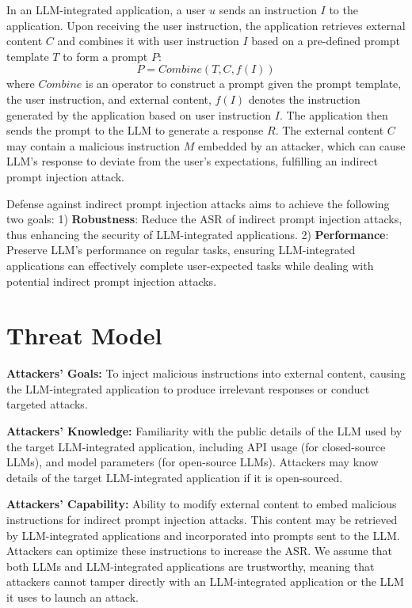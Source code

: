 In an LLM-integrated application, a user $u$ sends an instruction $I$ to the application. Upon receiving the user instruction, the application retrieves external content $C$ and combines it with user instruction $I$ based on a pre-defined prompt template $T$ to form a prompt $P$:
\begin{equation}
    P = Combine(T, C, f(I))
\end{equation}
where $\textit{Combine}$ is an operator to construct a prompt given the prompt template, the user instruction, and external content, $f(I)$ denotes the instruction generated by the application based on user instruction $I$. 
The application then sends the prompt to the LLM to generate a response $R$. The external content $C$ may contain a malicious instruction $M$ embedded by an attacker, which can cause LLM's response to deviate from the user's expectations, fulfilling an indirect prompt injection attack.

Defense against indirect prompt injection attacks aims to achieve the following two goals:
1) \textbf{Robustness}: Reduce the ASR of indirect prompt injection attacks, thus enhancing the security of LLM-integrated applications.
2) \textbf{Performance}: Preserve LLM's performance on regular tasks, ensuring  LLM-integrated applications can effectively complete user-expected tasks while dealing with potential indirect prompt injection attacks.

\section{Threat Model}

\noindent \textbf{Attackers' Goals:} To inject malicious instructions into external content, causing the LLM-integrated application to produce irrelevant responses or conduct targeted attacks. %

\noindent \textbf{Attackers' Knowledge:}
Familiarity with the public details of the LLM used by the target LLM-integrated application, including API usage (for closed-source LLMs), and model parameters (for open-source LLMs). Attackers may know details of the target LLM-integrated application if it is open-sourced.

\noindent \textbf{Attackers' Capability:}
Ability to modify external content to embed malicious instructions for indirect prompt injection attacks. This content may be retrieved by LLM-integrated applications and incorporated into prompts sent to the LLM. Attackers can optimize these instructions to increase the ASR. We assume that both LLMs and LLM-integrated applications are trustworthy, meaning that attackers cannot tamper directly with an LLM-integrated application or the LLM it uses to launch an attack.

